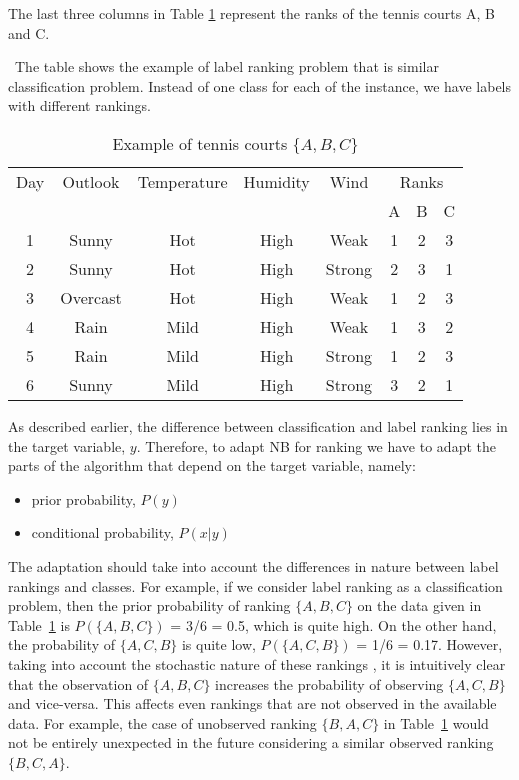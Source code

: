 The last three columns in Table \ref{ch2-tab01} represent the ranks of the tennis courts A, B and C.

\begin{table}
\caption{Example of tennis courts $\{A,B,C\}$}
\ The table shows the example of label ranking problem that is similar classification problem. Instead of one class for each of the instance, we have labels with different rankings.

\begin{tabular}{cccccccc}
\toprule
Day&Outlook&Temperature&Humidity&Wind&\multicolumn{3}{c}{Ranks}\\
\cline{6-8}
&&&&&A&B&C\\
\midrule
 1 & Sunny & Hot & High & Weak &   1 &   2 &   3 \\ 
  2 & Sunny & Hot & High & Strong &   2 &   3 &   1 \\ 
  3 & Overcast & Hot & High & Weak &   1 &   2 &   3 \\ 
  4 & Rain & Mild & High & Weak &   1 &   3 &   2 \\ 
  5 & Rain & Mild & High & Strong &   1 &   2 &   3 \\ 
  6 & Sunny & Mild & High & Strong &   3 &   2 &   1 \\ 
  
\bottomrule
\end{tabular}
\label{ch2-tab01}
\end{table}

As described earlier, the difference between classification and label ranking lies in the target variable, $y$. Therefore, to adapt NB for ranking we have to adapt the parts of the algorithm that depend on the target variable, namely:
\begin{itemize}
\item prior probability, $P(y)$
\item conditional probability, $P(x|y)$
\end{itemize}

The adaptation should take into account the differences in nature between label rankings and classes. For example, if we consider label ranking as a classification problem, then the prior probability of ranking $\{A,B,C\}$ on the data given in Table~\ref{ch2-tab01} is $P(\{A,B,C\})$ = 3/6 = 0.5, which is quite high. On the other hand, the probability of $\{A,C,B\}$ is quite low, $P(\{A,C,B\})$ = 1/6 = 0.17. However, taking into account the stochastic nature of these rankings \citep{cheng2009}, it is intuitively clear that the observation of $\{ A,B,C\}$ increases the probability of observing $\{A,C,B\}$ and vice-versa. This affects even rankings that are not observed in the available data. For example, the case of unobserved ranking $\{B,A,C\}$ in Table~\ref{ch2-tab01} would not be entirely unexpected in the future considering a similar observed ranking $\{B,C,A\}$. %

